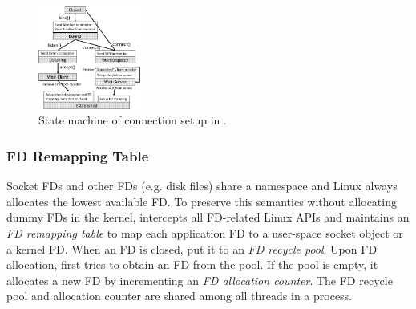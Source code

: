 

\begin{figure}[t!]
	\centering
	\includegraphics[width=0.3\textwidth]{images/conn-setup-new}
	\vspace{-5pt}
	\caption{State machine of connection setup in \libipc{}.}
	\label{fig:conn-setup}
\end{figure}


\subsubsection{FD Remapping Table}
\quad



Socket FDs and other FDs (e.g. disk files) share a namespace and Linux always allocates the lowest available FD.
To preserve this semantics without allocating dummy FDs in the kernel, \libipc{} intercepts all FD-related Linux APIs and maintains an \emph{FD remapping table} to map each application FD to a user-space socket object or a kernel FD.
When an FD is closed, \libipc{} put it to an \emph{FD recycle pool}.
Upon FD allocation, \libipc{} first tries to obtain an FD from the pool.
If the pool is empty, it allocates a new FD by incrementing an \emph{FD allocation counter}.
The FD recycle pool and allocation counter are shared among all threads in a process.%

